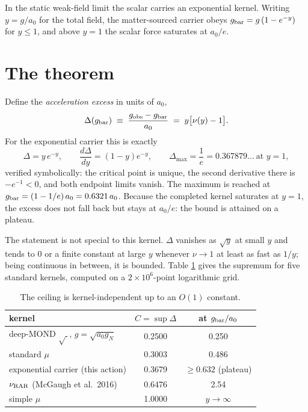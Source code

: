 \documentclass[11pt,letterpaper]{article}
\begin{document}
In the static weak-field limit the scalar carries an exponential kernel. Writing $y=g/a_0$ for the total field, the matter-sourced carrier obeys $g_{\rm bar}=g\,(1-e^{-y})$ for $y\le1$, and above $y=1$ the scalar force saturates at $a_0/e$.

\section{The theorem}
Define the \emph{acceleration excess} in units of $a_0$,
\begin{equation}
\Delta(g_{\rm bar})\;\equiv\;\frac{g_{\rm obs}-g_{\rm bar}}{a_0}\;=\;y\big[\nu(y)-1\big].
\end{equation}
For the exponential carrier this is exactly
\begin{equation}
\boxed{\;\Delta=y\,e^{-y},\qquad \frac{d\Delta}{dy}=(1-y)e^{-y},\qquad \Delta_{\max}=\frac1e=0.367879\ldots\ \text{at } y=1,\;}
\end{equation}
verified symbolically: the critical point is unique, the second derivative there is $-e^{-1}<0$, and both endpoint limits vanish. The maximum is reached at $g_{\rm bar}=(1-1/e)\,a_0=0.6321\,a_0$. Because the completed kernel saturates at $y=1$, the excess does not fall back but stays at $a_0/e$: the bound is attained on a plateau.

The statement is not special to this kernel. $\Delta$ vanishes as $\sqrt{y}$ at small $y$ and tends to $0$ or a finite constant at large $y$ whenever $\nu\to1$ at least as fast as $1/y$; being continuous in between, it is bounded. Table \ref{tab:C} gives the supremum for five standard kernels, computed on a $2\times10^6$-point logarithmic grid.

\begin{table}[h]\centering
\begin{tabular}{lcc}\toprule
kernel & $C=\sup\Delta$ & at $g_{\rm bar}/a_0$\\\midrule
deep-MOND $\sqrt{\ }$, $g=\sqrt{a_0g_N}$ & 0.2500 & 0.250\\
standard $\mu$ & 0.3003 & 0.486\\
exponential carrier (this action) & 0.3679 & $\ge0.632$ (plateau)\\
$\nu_{\rm RAR}$ (McGaugh et al.\ 2016) & 0.6476 & 2.54\\
simple $\mu$ & 1.0000 & $y\to\infty$\\\bottomrule
\end{tabular}
\caption{The ceiling is kernel-independent up to an $O(1)$ constant.}\label{tab:C}
\end{table}
\end{document}
